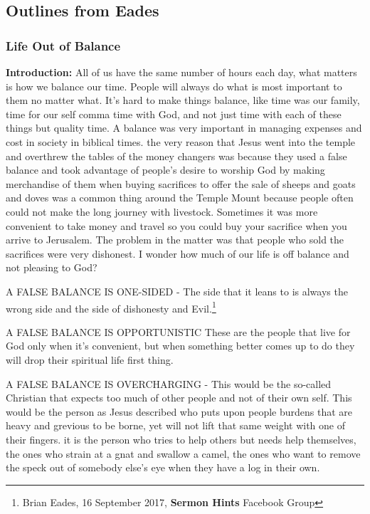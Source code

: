 \subsection{Outlines from Eades}

\subsubsection{Life Out of Balance}




\textbf{Introduction:} All of us have the same number of hours each day, what matters is how we balance our time. People will always do what is most important to them no matter what. It's hard to make things balance, like time was our family, time for our self comma time with God, and not just time with each of these things but quality time. A balance was very important in managing expenses and cost in society in biblical times. the very reason that Jesus went into the temple and overthrew the tables of the money changers was because they used a false balance and took advantage of people's desire to worship God by making merchandise of them when buying sacrifices to offer the sale of sheeps and goats and doves was a common thing around the Temple Mount because people often could not make the long journey with livestock. Sometimes it was more convenient to take money and travel so you could buy your sacrifice when you arrive to Jerusalem. The problem in the matter was that people who sold the sacrifices were very dishonest. I wonder how much of our life is off balance and not pleasing to God?
\begin{compactenum}[I.]
    \item A FALSE BALANCE IS ONE-SIDED - The side that it leans to is always the wrong side and the side of dishonesty and Evil.\footnote{Brian Eades, 16 September 2017, \textbf{Sermon Hints} Facebook Group}
    \item A FALSE BALANCE IS OPPORTUNISTIC These are the people that live for God only when it's convenient, but when something better comes up to do they will drop their spiritual life first thing.
    \item A FALSE BALANCE IS OVERCHARGING - This would be the so-called Christian that expects too much of other people and not of their own self. This would be the person as Jesus described who puts upon people burdens that are heavy and grevious to be borne, yet will not lift that same weight with one of their fingers. it is the person who tries to help others but needs help themselves, the ones who strain at a gnat and swallow a camel, the ones who want to remove the speck out of somebody else's eye when they have a log in their own.
\end{compactenum}

